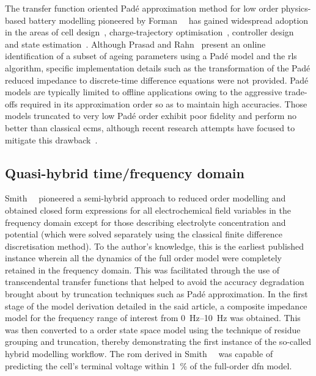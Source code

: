 The     transfer     function     oriented     Padé     approximation     method
for    low    order    physics-based     battery    modelling    pioneered    by
Forman~\etal{}~\cite{Forman2011a}    has   gained    widespread   adoption    in
the    areas     of    cell     design~\cite{Marcicki2013},    charge-trajectory
optimisation~\cite{Bashash2010},    controller    design~\cite{Perez2015}    and
state    estimation~\cite{Marcicki2013,Moura2012}.     Although    Prasad    and
Rahn~\cite{Prasad2013} present  an online identification  of a subset  of ageing
parameters  using  a Padé  model  and  the  \gls{rls}  algorithm,
specific implementation details  such as the transformation of  the Padé reduced
impedance to discrete-time  difference equations were not  provided. Padé models
are typically limited to offline applications owing to the aggressive trade-offs
required in  its approximation order  so as  to maintain high  accuracies. Those
models truncated  to very low  Padé order exhibit  poor fidelity and  perform no
better  than  classical  \glspl{ecm},  although recent  research  attempts  have
focused to mitigate this drawback~\cite{Yuan2017a,Yuan2017}.


\subsection{Quasi-hybrid time/frequency domain }\label{subsec:quasiroms}

Smith~\etal{}~\cite{Smith2007} pioneered a semi-hybrid approach to reduced order
modelling and  obtained closed  form expressions  for all  electrochemical field
variables  in  the frequency  domain  except  for those  describing  electrolyte
concentration and  potential (which were  solved separately using  the classical
finite  difference  discretisation  method).  To the  author's  knowledge,  this
is  the  earliest published  instance  wherein  all  the  dynamics of  the  full
order  model  were  completely  retained  in  the  frequency  domain.  This  was
facilitated through  the use  of transcendental  transfer functions  that helped
to  avoid  the  accuracy  degradation brought  about  by  truncation  techniques
such  as  Padé  approximation.  In  the first  stage  of  the  model  derivation
detailed in  the said  article, a  composite impedance  model for  the frequency
range  of interest  from  \SIrange{0}{10}{\hertz} was  obtained.  This was  then
converted to a  order state  space model using the technique of
residue  grouping  and  truncation,  thereby demonstrating  the  first  instance
of  the   so-called  hybrid  modelling   workflow.  The  \gls{rom}   derived  in
Smith~\etal{}~\cite{Smith2007}  was capable  of predicting  the cell's  terminal
voltage within \SI{1}{\percent} of the full-order \gls{dfn} model.

